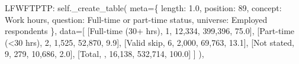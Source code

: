 \documentclass[
  11pt,
  a4paper,
]{article}
\newenvironment{Shaded}{\begin{snugshade}}{\end{snugshade}}
\newcommand{\NormalTok}[1]{\textcolor[rgb]{0.00,0.23,0.31}{#1}}
\newcommand{\OperatorTok}[1]{\textcolor[rgb]{0.37,0.37,0.37}{#1}}
\newcommand{\StringTok}[1]{\textcolor[rgb]{0.13,0.47,0.30}{#1}}
\newcommand{\VariableTok}[1]{\textcolor[rgb]{0.07,0.07,0.07}{#1}}
\begin{document}
\begin{Shaded}
\begin{Highlighting}[]
            \StringTok{\textquotesingle{}LFWFTPTP\textquotesingle{}}\NormalTok{: }\VariableTok{self}\NormalTok{.\_create\_table(}
\NormalTok{                meta}\OperatorTok{=}\NormalTok{\{}
                    \StringTok{\textquotesingle{}length\textquotesingle{}}\NormalTok{: }\StringTok{\textquotesingle{}1.0\textquotesingle{}}\NormalTok{, }\StringTok{\textquotesingle{}position\textquotesingle{}}\NormalTok{: }\StringTok{\textquotesingle{}89\textquotesingle{}}\NormalTok{,}
                    \StringTok{\textquotesingle{}concept\textquotesingle{}}\NormalTok{: }\StringTok{\textquotesingle{}Work hours\textquotesingle{}}\NormalTok{,}
                    \StringTok{\textquotesingle{}question\textquotesingle{}}\NormalTok{: }\StringTok{\textquotesingle{}Full{-}time or part{-}time status\textquotesingle{}}\NormalTok{,}
                    \StringTok{\textquotesingle{}universe\textquotesingle{}}\NormalTok{: }\StringTok{\textquotesingle{}Employed respondents\textquotesingle{}}
\NormalTok{                \},}
\NormalTok{                data}\OperatorTok{=}\NormalTok{[}
\NormalTok{                    [}\StringTok{\textquotesingle{}Full{-}time (30+ hrs)\textquotesingle{}}\NormalTok{, }\StringTok{\textquotesingle{}1\textquotesingle{}}\NormalTok{, }\StringTok{\textquotesingle{}12,334\textquotesingle{}}\NormalTok{, }\StringTok{\textquotesingle{}399,396\textquotesingle{}}\NormalTok{, }\StringTok{\textquotesingle{}75.0\textquotesingle{}}\NormalTok{],}
\NormalTok{                    [}\StringTok{\textquotesingle{}Part{-}time (\textless{}30 hrs)\textquotesingle{}}\NormalTok{, }\StringTok{\textquotesingle{}2\textquotesingle{}}\NormalTok{, }\StringTok{\textquotesingle{}1,525\textquotesingle{}}\NormalTok{, }\StringTok{\textquotesingle{}52,870\textquotesingle{}}\NormalTok{, }\StringTok{\textquotesingle{}9.9\textquotesingle{}}\NormalTok{],}
\NormalTok{                    [}\StringTok{\textquotesingle{}Valid skip\textquotesingle{}}\NormalTok{, }\StringTok{\textquotesingle{}6\textquotesingle{}}\NormalTok{, }\StringTok{\textquotesingle{}2,000\textquotesingle{}}\NormalTok{, }\StringTok{\textquotesingle{}69,763\textquotesingle{}}\NormalTok{, }\StringTok{\textquotesingle{}13.1\textquotesingle{}}\NormalTok{],}
\NormalTok{                    [}\StringTok{\textquotesingle{}Not stated\textquotesingle{}}\NormalTok{, }\StringTok{\textquotesingle{}9\textquotesingle{}}\NormalTok{, }\StringTok{\textquotesingle{}279\textquotesingle{}}\NormalTok{, }\StringTok{\textquotesingle{}10,686\textquotesingle{}}\NormalTok{, }\StringTok{\textquotesingle{}2.0\textquotesingle{}}\NormalTok{],}
\NormalTok{                    [}\StringTok{\textquotesingle{}Total\textquotesingle{}}\NormalTok{, }\StringTok{\textquotesingle{}\textquotesingle{}}\NormalTok{, }\StringTok{\textquotesingle{}16,138\textquotesingle{}}\NormalTok{, }\StringTok{\textquotesingle{}532,714\textquotesingle{}}\NormalTok{, }\StringTok{\textquotesingle{}100.0\textquotesingle{}}\NormalTok{]}
\NormalTok{                ]}
\NormalTok{            ),}
            

\end{Highlighting}
\end{Shaded}
\end{document}
